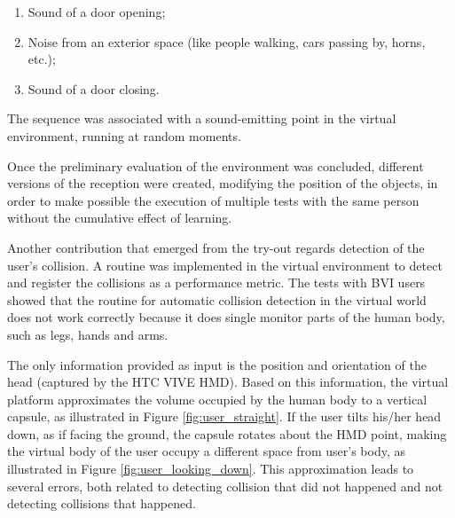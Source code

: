         \begin{enumerate}
            \item Sound of a door opening;
            \item Noise from an exterior space (like people walking, cars passing by, horns, etc.);
            \item Sound of a door closing.
        \end{enumerate}
        
        The sequence was associated with a sound-emitting point in the virtual environment, running at random moments. 

        Once the preliminary evaluation of the environment was concluded, different versions of the reception were created, modifying the position of the objects, in order to make possible the execution of multiple tests with the same person without the cumulative effect of learning. 

        Another contribution that emerged from the try-out regards detection of the user's collision. A routine was implemented in the virtual environment to detect and register the collisions as a performance metric. The tests with BVI users showed that the routine for automatic collision detection in the virtual world does not work correctly because it does single monitor parts of the human body, such as legs, hands and arms. 

        The only information provided as input is the position and orientation of the head (captured by the HTC VIVE HMD). Based on this information, the virtual platform approximates the volume occupied by the human body to a vertical capsule, as illustrated in Figure \ref{fig:user_straight}. If the user tilts his/her head down, as if facing the ground, the capsule rotates about the HMD point, making the virtual body of the user occupy a different space from user's body, as illustrated in Figure \ref{fig:user_looking_down}. This approximation leads to several errors, both related to detecting collision that did not happened and not detecting collisions that happened.

